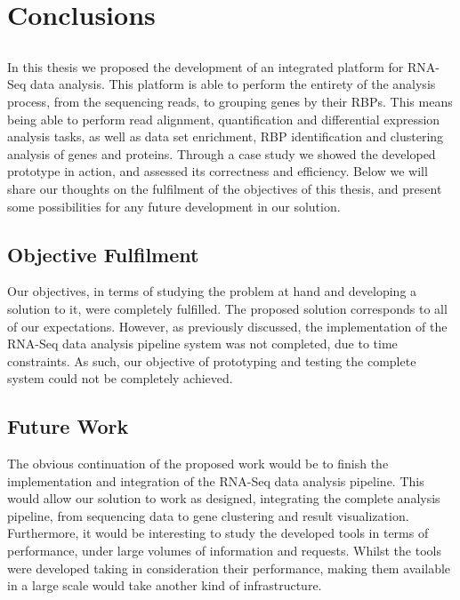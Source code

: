 \chapter{Conclusions} \label{chap:conclusions}

\section*{}


In this thesis we proposed the development of an integrated platform for RNA-Seq
data analysis. This platform is able to perform the entirety of the analysis
process, from the sequencing reads, to grouping genes by their RBPs. This means
being able to perform read alignment, quantification and differential expression
analysis tasks, as well as data set enrichment, RBP identification and
clustering analysis of genes and proteins. Through a case study we showed the
developed prototype in action, and assessed its correctness and efficiency.
Below we will share our thoughts on the fulfilment of the objectives of this
thesis, and present some possibilities for any future development in our
solution.

\section{Objective Fulfilment}

Our objectives, in terms of studying the problem at hand and developing a
solution to it, were completely fulfilled. The proposed solution corresponds to
all of our expectations. However, as previously discussed, the implementation of
the RNA-Seq data analysis pipeline system was not completed, due to time
constraints. As such, our objective of prototyping and testing the complete
system could not be completely achieved.

\section{Future Work}

The obvious continuation of the proposed work would be to finish the
implementation and integration of the RNA-Seq data analysis pipeline. This would
allow our solution to work as designed, integrating the complete analysis
pipeline, from sequencing data to gene clustering and result visualization.
Furthermore, it would be interesting to study the developed tools in terms of
performance, under large volumes of information and requests. Whilst the tools
were developed taking in consideration their performance, making them available
in a large scale would take another kind of infrastructure.
